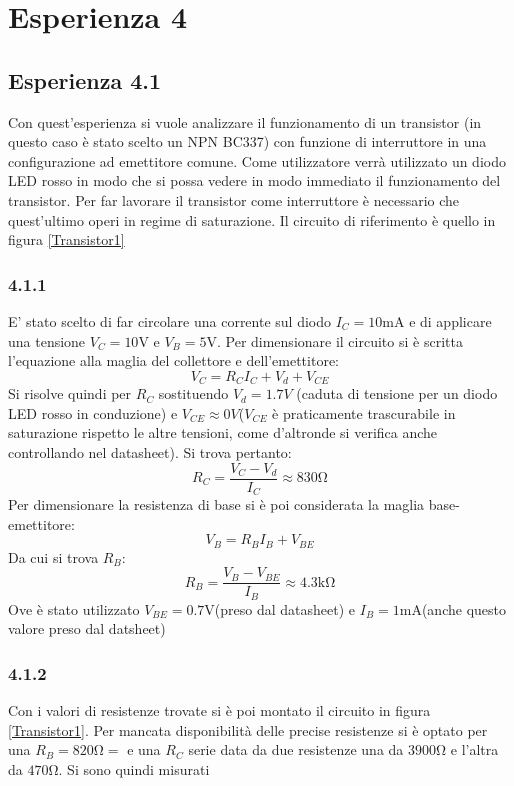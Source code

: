 \section{Esperienza 4}
\subsection{Esperienza 4.1}
Con quest'esperienza si vuole analizzare il funzionamento di un transistor (in questo caso è stato scelto un NPN BC337) con funzione di interruttore in una configurazione ad emettitore comune. Come utilizzatore verrà utilizzato un diodo LED rosso in modo che si possa vedere in modo immediato il funzionamento del transistor. Per far lavorare il transistor come interruttore è necessario che quest'ultimo operi in regime di saturazione. Il circuito di riferimento è quello in figura \ref{Transistor1}
\subsubsection{4.1.1}
E' stato scelto di far circolare una corrente sul diodo $I_C=10\unit{\mA}$ e di applicare una tensione $V_C=10\unit{\V}$ e $V_B=5\unit{\V}$. Per dimensionare il circuito si è scritta l'equazione alla maglia del collettore e dell'emettitore:
\begin{equation*}
    V_C=R_C I_C + V_d +V_{CE}
\end{equation*}
Si risolve quindi per $R_C$ sostituendo $V_d=1.7V$ (caduta di tensione per un diodo LED rosso in conduzione) e $V_{CE}\approx 0V$($V_{CE}$ è praticamente trascurabile in saturazione rispetto le altre tensioni, come d'altronde si verifica anche controllando nel datasheet). Si trova pertanto:
\begin{equation*}
    R_C=\frac{V_C-V_d}{{I_C}}\approx 830\unit{\ohm}
\end{equation*}
Per dimensionare la resistenza di base si è poi considerata la maglia base-emettitore:
\begin{equation*}
    V_B=R_B I_B+V_{BE}
\end{equation*}
Da cui si trova $R_B$:
\begin{equation*}
    R_B=\frac{V_B-V_{BE}}{I_B} \approx 4.3 \unit{\kohm}
\end{equation*}
Ove è stato utilizzato $V_{BE}=0.7\unit{\V}$(preso dal datasheet) e $I_B=1\unit{\mA}$(anche questo valore preso dal datsheet)
\subsubsection{4.1.2}
Con i valori di resistenze trovate si è poi montato il circuito in figura \ref{Transistor1}. Per mancata disponibilità delle precise resistenze si è optato per una $R_B=820\unit{\ohm}=$ e una $R_C$ serie data da due resistenze una da $3900\unit{\ohm}$ e l'altra da $470\unit{\ohm}$. Si sono quindi misurati 
